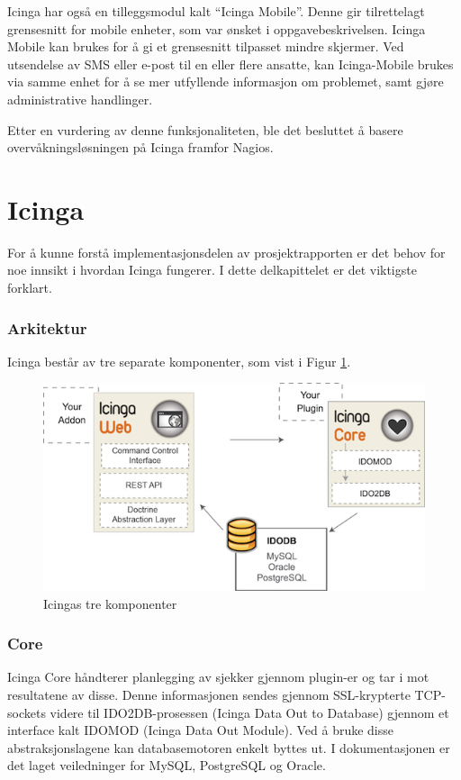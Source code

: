 Icinga har også en tilleggsmodul kalt ``Icinga Mobile''. Denne gir tilrettelagt grensesnitt for mobile enheter, som var ønsket i oppgavebeskrivelsen. Icinga Mobile kan brukes for å gi et grensesnitt tilpasset mindre skjermer. Ved utsendelse av SMS eller e-post til en eller flere ansatte, kan Icinga-Mobile brukes via samme enhet for å se mer utfyllende informasjon om problemet, samt gjøre administrative handlinger.

Etter en vurdering av denne funksjonaliteten, ble det besluttet å basere overvåkningsløsningen på Icinga framfor Nagios.
\clearpage
\section{Icinga}
For å kunne forstå implementasjonsdelen av prosjektrapporten er det behov for noe innsikt i hvordan Icinga fungerer. I dette delkapittelet er det viktigste forklart.
\subsubsection{Arkitektur}
Icinga består av tre separate komponenter, som vist i Figur \ref{icingacomponents}.

\begin{figure}[H]
    \centering
    \includegraphics[scale=1.2]{img/icinga_architecture}
    \caption{Icingas tre komponenter}
    \label{icingacomponents}
\end{figure}

\subsubsection{Core}
Icinga Core håndterer planlegging av sjekker gjennom plugin-er og tar i mot resultatene av disse. Denne informasjonen sendes gjennom SSL-krypterte TCP-sockets videre til IDO2DB-prosessen (Icinga Data Out to Database) gjennom et interface kalt IDOMOD (Icinga Data Out Module). Ved å bruke disse abstraksjonslagene kan databasemotoren enkelt byttes ut. I dokumentasjonen er det laget veiledninger for MySQL, PostgreSQL og Oracle\cite{icingaarchitecture}.

